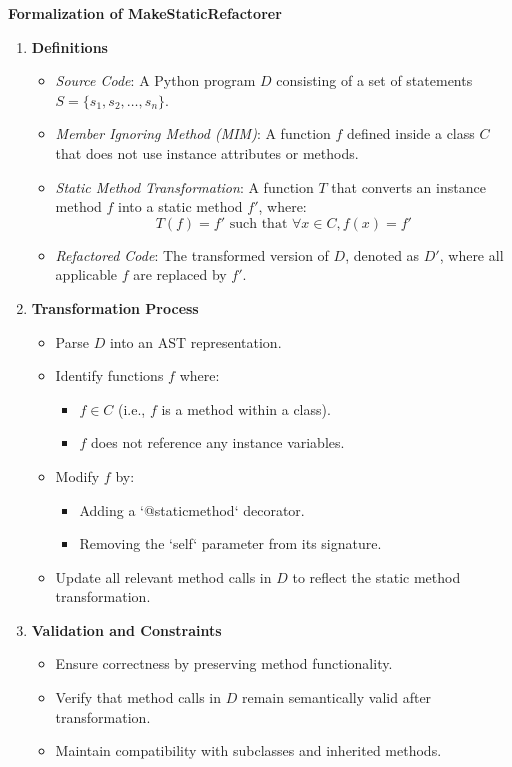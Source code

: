 \documentclass[12pt, titlepage]{article}
\begin{document}
\textbf{Formalization of MakeStaticRefactorer}

\begin{enumerate}
  \item \textbf{Definitions}
  \begin{itemize}
      \item \textit{Source Code}: A Python program \( D \) consisting of a set of statements \( S = \{ s_1, s_2, \dots, s_n \} \).
      \item \textit{Member Ignoring Method (MIM)}: A function \( f \) defined inside a class \( C \) that does not use instance attributes or methods.
      \item \textit{Static Method Transformation}: A function \( T \) that converts an instance method \( f \) into a static method \( f' \), where:
      \[
      T(f) = f' \text{ such that } \forall x \in C, f(x) = f'
      \]
      \item \textit{Refactored Code}: The transformed version of \( D \), denoted as \( D' \), where all applicable \( f \) are replaced by \( f' \).
  \end{itemize}

  \item \textbf{Transformation Process}
  \begin{itemize}
      \item Parse \( D \) into an AST representation.
      \item Identify functions \( f \) where:
      \begin{itemize}
          \item \( f \in C \) (i.e., \( f \) is a method within a class).
          \item \( f \) does not reference any instance variables.
      \end{itemize}
      \item Modify \( f \) by:
      \begin{itemize}
          \item Adding a `@staticmethod` decorator.
          \item Removing the `self` parameter from its signature.
      \end{itemize}
      \item Update all relevant method calls in \( D \) to reflect the static method transformation.
  \end{itemize}

  \item \textbf{Validation and Constraints}
  \begin{itemize}
      \item Ensure correctness by preserving method functionality.
      \item Verify that method calls in \( D \) remain semantically valid after transformation.
      \item Maintain compatibility with subclasses and inherited methods.
  \end{itemize}
\end{enumerate}
\end{document}
